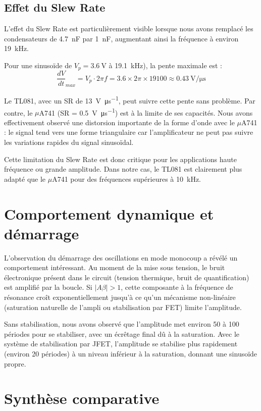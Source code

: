 \documentclass[11pt,a4paper]{report}
\begin{document}
\subsection{Effet du Slew Rate}

L'effet du Slew Rate est particulièrement visible lorsque nous avons remplacé les condensateurs de \SI{4.7}{\nano\farad} par \SI{1}{\nano\farad}, augmentant ainsi la fréquence à environ \SI{19}{\kilo\hertz}.

Pour une sinusoïde de \(V_p = \SI{3.6}{\volt}\) à \SI{19.1}{\kilo\hertz}), la pente maximale est :
\[
\frac{dV}{dt}_{max} = V_p \cdot 2\pi f = 3.6 \times 2\pi \times 19100 \approx \SI{0.43}{\volt\per\micro\second}
\]

Le TL081, avec un SR de \SI{13}{\volt\per\micro\second}, peut suivre cette pente sans problème. Par contre, le \(\mu\)A741 (SR = \SI{0.5}{\volt\per\micro\second}) est à la limite de ses capacités. Nous avons effectivement observé une distorsion importante de la forme d'onde avec le \(\mu\)A741 : le signal tend vers une forme triangulaire car l'amplificateur ne peut pas suivre les variations rapides du signal sinusoïdal.

Cette limitation du Slew Rate est donc critique pour les applications haute fréquence ou grande amplitude. Dans notre cas, le TL081 est clairement plus adapté que le \(\mu\)A741 pour des fréquences supérieures à \SI{10}{\kilo\hertz}.

\section{Comportement dynamique et démarrage}

L'observation du démarrage des oscillations en mode monocoup a révélé un comportement intéressant. Au moment de la mise sous tension, le bruit électronique présent dans le circuit (tension thermique, bruit de quantification) est amplifié par la boucle. Si \(|A\beta| > 1\), cette composante à la fréquence de résonance croît exponentiellement jusqu'à ce qu'un mécanisme non-linéaire (saturation naturelle de l'ampli ou stabilisation par FET) limite l'amplitude.

Sans stabilisation, nous avons observé que l'amplitude met environ 50 à 100 périodes pour se stabiliser, avec un écrêtage final dû à la saturation. Avec le système de stabilisation par JFET, l'amplitude se stabilise plus rapidement (environ 20 périodes) à un niveau inférieur à la saturation, donnant une sinusoïde propre.

\section{Synthèse comparative}
\end{document}
